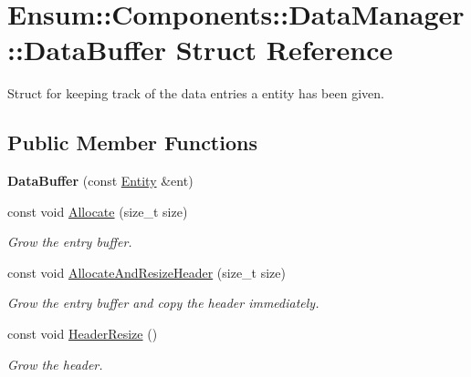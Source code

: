 \hypertarget{struct_ensum_1_1_components_1_1_data_manager_1_1_data_buffer}{}\section{Ensum\+:\+:Components\+:\+:Data\+Manager\+:\+:Data\+Buffer Struct Reference}
\label{struct_ensum_1_1_components_1_1_data_manager_1_1_data_buffer}


Struct for keeping track of the data entries a entity has been given.  


\subsection*{Public Member Functions}
\begin{DoxyCompactItemize}
\item 
{\bfseries Data\+Buffer} (const \hyperlink{struct_ensum_1_1_components_1_1_entity}{Entity} \&ent)\hypertarget{struct_ensum_1_1_components_1_1_data_manager_1_1_data_buffer_a1dcb14cba81346865107759292b46d2c}{}\label{struct_ensum_1_1_components_1_1_data_manager_1_1_data_buffer_a1dcb14cba81346865107759292b46d2c}

\item 
const void \hyperlink{struct_ensum_1_1_components_1_1_data_manager_1_1_data_buffer_a70b839f07c569748fd321a40a7369575}{Allocate} (size\+\_\+t size)\hypertarget{struct_ensum_1_1_components_1_1_data_manager_1_1_data_buffer_a70b839f07c569748fd321a40a7369575}{}\label{struct_ensum_1_1_components_1_1_data_manager_1_1_data_buffer_a70b839f07c569748fd321a40a7369575}

\begin{DoxyCompactList}\small\item\em Grow the entry buffer. \end{DoxyCompactList}\item 
const void \hyperlink{struct_ensum_1_1_components_1_1_data_manager_1_1_data_buffer_a58b80765b7c5384c639237addd6c30be}{Allocate\+And\+Resize\+Header} (size\+\_\+t size)\hypertarget{struct_ensum_1_1_components_1_1_data_manager_1_1_data_buffer_a58b80765b7c5384c639237addd6c30be}{}\label{struct_ensum_1_1_components_1_1_data_manager_1_1_data_buffer_a58b80765b7c5384c639237addd6c30be}

\begin{DoxyCompactList}\small\item\em Grow the entry buffer and copy the header immediately. \end{DoxyCompactList}\item 
const void \hyperlink{struct_ensum_1_1_components_1_1_data_manager_1_1_data_buffer_a1ec69ae3f18745283e3190ea663a17a2}{Header\+Resize} ()\hypertarget{struct_ensum_1_1_components_1_1_data_manager_1_1_data_buffer_a1ec69ae3f18745283e3190ea663a17a2}{}\label{struct_ensum_1_1_components_1_1_data_manager_1_1_data_buffer_a1ec69ae3f18745283e3190ea663a17a2}

\begin{DoxyCompactList}\small\item\em Grow the header. \end{DoxyCompactList}\end{DoxyCompactItemize}
